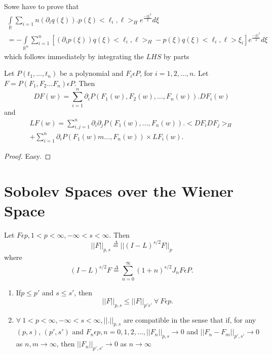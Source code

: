 So\pageoriginale we have to prove that
\begin{multline*}
  \int\limits_{\mathbb{R}} \sum_{i=1}{n} (\partial_i q (\xi)). p(\xi)<
  \ell_i, \ell > _H e^{\frac{-|\xi|^2}{2}} d\xi\\ 
  =- \int\limits_{\mathbb{R}^n} \sum_{i=1}^{n} \left[(\partial _i p (\xi))q
    (\xi) < \ell_i, \ell > _H -p (\xi) q(\xi) < \ell _i, \ell >
    \xi_i\right]e^{\frac{-|\xi|^2}{2}} d\xi 
\end{multline*}
which follows immediately by integrating the $LHS$ by parts

\begin{proposition}%
Let $P (t_1, \ldots, t_n)$ be a polynomial and $F_i \epsilon  P$,
for $i= 1,2, \ldots, n$. Let $F = P (F_1, F_2 \ldots F_n)
\epsilon  P$. Then  
$$
DF (w) = \sum_{i=1}^{n} \partial_i P(F_1 (w), F_2 (w), \ldots, F_n
(w)). DF_i (w) 
$$ 
and
\begin{multline*}
  LF (w)  = \sum_{i, j=1}^{n}\partial_i \partial_j P (F_1 (w), \ldots
 , F_n (w)). < DF_i DF_j> _H\\ 
 + \sum_{i=1}^{n} \partial _i P(F_1 (w) m \ldots, F_n (w)) \times LF_i (w).
\end{multline*}
\end{proposition}

\begin{proof}
   Easy.
\end{proof} 

\section{Sobolev Spaces over the Wiener Space}%

\begin{definition}%
Let $F \epsilon  p, 1 < p < \infty, -\infty < s < \infty$. Then 
$$
|| F||_{p,s} \overset{\Delta}=|| (I-L)^{s/2} F ||_p
$$
where
$$
(I-L)^{s/2} F \overset{\Delta}{=} \sum_{n=0}^{\infty}(1+n)^{s/2} J_n F
\epsilon  P. 
$$
\end{definition}

\begin{proposition}%
  \begin{enumerate}[\rm (i)]
  \item If\pageoriginale $p \leq p'$ and $s \leq s'$, then
    $$
    || F||_{p,s} \leq || F||_{p's'} ~\forall~ F \epsilon p.
    $$

  \item $\forall~ 1 < p < \infty, -\infty < s < \infty, || . || _{p,s}$
    are compatible in the sense that if, for any $(p,s)$, $(p', s')$
    and $F_n \epsilon  p, n = 0,1,2, \ldots, || F_n ||_{p,s} \to
    0$ and $|| F_n - F_m ||_{p',s'}\to 0$ as $n,m \to \infty$, then
    $|| F_n || _{p',s'}\to 0$ as $n \to \infty$ 
  \end{enumerate}
\end{proposition}

